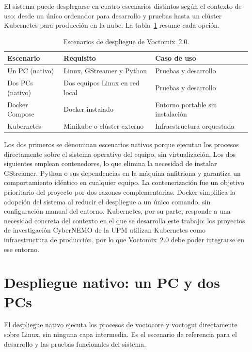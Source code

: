 El sistema puede desplegarse en cuatro escenarios distintos según el contexto de uso:
desde un único ordenador para desarrollo y pruebas hasta un clúster Kubernetes para
producción en la nube. La tabla~\ref{tab:escenarios_despliegue} resume cada opción.

\begin{table}[H]
  \centering
  \caption{Escenarios de despliegue de Voctomix~2.0.}
  \label{tab:escenarios_despliegue}
  \small
  \begin{tabularx}{\textwidth}{|l|X|l|}
    \hline
    \textbf{Escenario} & \textbf{Requisito} & \textbf{Caso de uso} \\
    \hline
    Un PC (nativo)   & Linux, GStreamer y Python       & Pruebas y desarrollo \\
    Dos PCs (nativo) & Dos equipos Linux en red local  & Pruebas y desarrollo \\
    Docker Compose   & Docker instalado                & Entorno portable sin instalación \\
    Kubernetes       & Minikube o clúster externo      & Infraestructura orquestada \\
    \hline
  \end{tabularx}
\end{table}

Los dos primeros se denominan escenarios nativos porque ejecutan los procesos directamente
sobre el sistema operativo del equipo, sin virtualización. Los dos siguientes emplean
contenedores, lo que elimina la necesidad de instalar GStreamer, Python o sus dependencias
en la máquina anfitriona y garantiza un comportamiento idéntico en cualquier equipo.
La contenerización fue un objetivo prioritario del proyecto por dos razones complementarias.
Docker simplifica la adopción del sistema al reducir el despliegue a un único comando,
sin configuración manual del entorno. Kubernetes, por su parte, responde a una necesidad
concreta del contexto en el que se desarrolla este trabajo: los proyectos de investigación
CyberNEMO de la UPM utilizan Kubernetes como infraestructura de producción, por lo
que Voctomix~2.0 debe poder integrarse en ese entorno.

\section{Despliegue nativo: un PC y dos PCs}
\label{sec:despliegue_nativo}

El despliegue nativo ejecuta los procesos de voctocore y voctogui directamente sobre
Linux, sin ninguna capa intermedia. Es el escenario de referencia para el desarrollo
y las pruebas funcionales del sistema.

